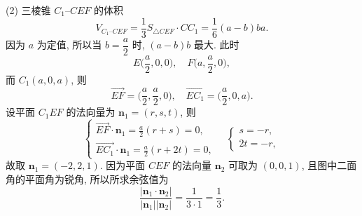     (2) 三棱锥 $C_1\text{--}CEF$ 的体积
    \[V_{C_1\text{--}CEF}= \frac13 S_{\triangle CEF}\cdot CC_1
    = \frac16(a-b)ba.\]
    因为 $a$ 为定值, 所以当 $b= \dfrac{a}2$ 时, $(a-b)b$ 最大. 此时
    \[E\biggl(\frac{a}2,0,0\biggr),\quad
    F\biggl(a,\frac{a}2,0\biggr),\]
    而 $C_1(a,0,a)$, 则
    \[\overrightarrow{EF}= \biggl(\frac{a}2,\frac{a}2,0\biggr),\quad
    \overrightarrow{EC_1}= \biggl(\frac{a}2,0,a\biggr).\]
    设平面 $C_1EF$ 的法向量为 $\bm{n}_1= (r,s,t)$, 则
    \[\left\{\!\!\begin{array}{l}
        \overrightarrow{EF}\cdot\bm{n}_1= \frac{a}2(r+s)=0,\\[4pt]
        \overrightarrow{EC_1}\cdot\bm{n}_1= \frac{a}2(r+2t)=0,
    \end{array}\right.\quad
    \left\{\!\!\begin{array}{l}
        s= -r,\\
        2t= -r,
    \end{array}\right.\]
    故取 $\bm{n}_1= (-2,2,1)$. 因为平面 $CEF$ 的法向量 $\bm{n}_2$ 可取为 $(0,0,1)$, 且图中二面角的平面角为锐角, 所以所求余弦值为
    \[\frac{|\bm{n}_1\cdot\bm{n}_2|}{|\bm{n}_1| |\bm{n}_2|}
    = \frac{1}{3\cdot 1}= \frac13.\]
\endsolution
